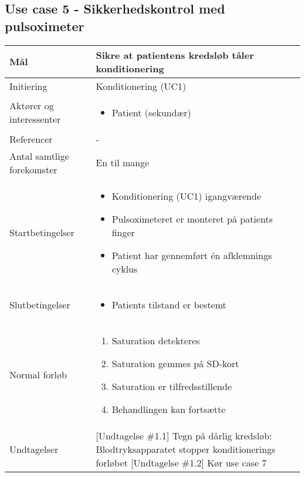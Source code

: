 	\subsection{Use case 5 - Sikkerhedskontrol med pulsoximeter}
		\begin{center}
			\begin{tabular}{ | p{} | p{}| } 
				\hline
				Mål & Sikre at patientens kredsløb tåler konditionering \\ 
				\hline
				Initiering &  Konditionering (UC1)\\
				\hline
				Aktører og interessenter & 
				\begin{itemize}
					\item Patient (sekundær)
				\end{itemize} \\ 
				\hline
				Referencer & - \\ 
				\hline
				Antal samtlige forekomster & En til mange \\ 
				\hline	
				Startbetingelser & 
				\begin{itemize}
					\item Konditionering (UC1) igangværende
					\item Pulsoximeteret er monteret på patients finger
					\item Patient har gennemført én afklemnings cyklus
 				\end{itemize} \\ 
				\hline
				Slutbetingelser & 
				\begin{itemize}
					\item Patients tilstand er bestemt 
				\end{itemize} \\ 
				\hline
				Normal forløb & \begin{enumerate}
					\setlength\itemsep{0cm} %
					\item Saturation detekteres
					\item Saturation gemmes på SD-kort
					\item Saturation er tilfredsstillende
					\subitem [Undtagelse \#1.1][Undtagelse \#1.2]
					\item Behandlingen kan fortsætte
				\end{enumerate} \\ 
				\hline
				Undtagelser &  [Undtagelse \#1.1] Tegn på dårlig kredsløb: Blodtryksapparatet stopper konditionerings forløbet 
				[Undtagelse \#1.2] Kør use case 7\\ 
				\hline
			\end{tabular}
		\end{center}
			\pagebreak